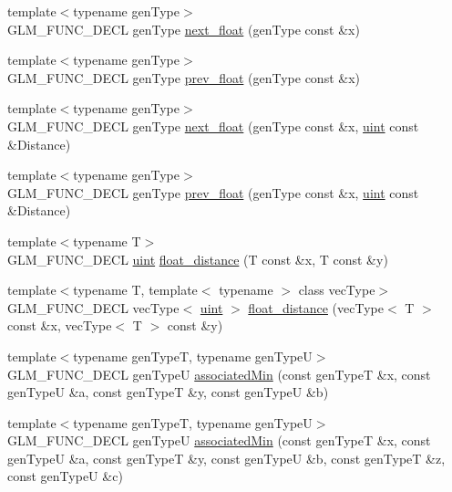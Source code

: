 \begin{CompactItemize}
\item 
{\footnotesize template$<$typename genType$>$ }\\GLM\_\-FUNC\_\-DECL genType \hyperlink{group__gtc__ulp_g5ec4457d254b7b960db32f10d219fd6f}{next\_\-float} (genType const \&x)
\item 
{\footnotesize template$<$typename genType$>$ }\\GLM\_\-FUNC\_\-DECL genType \hyperlink{group__gtc__ulp_gf1c61fb2a0092a4222dae424dd96aeb0}{prev\_\-float} (genType const \&x)
\item 
{\footnotesize template$<$typename genType$>$ }\\GLM\_\-FUNC\_\-DECL genType \hyperlink{group__gtc__ulp_g686013928fd7c76c5f100b84483b1f51}{next\_\-float} (genType const \&x, \hyperlink{group__core__precision_g4fd29415871152bfb5abd588334147c8}{uint} const \&Distance)
\item 
{\footnotesize template$<$typename genType$>$ }\\GLM\_\-FUNC\_\-DECL genType \hyperlink{group__gtc__ulp_ge55d449df292398361ccecad1cc5ead4}{prev\_\-float} (genType const \&x, \hyperlink{group__core__precision_g4fd29415871152bfb5abd588334147c8}{uint} const \&Distance)
\item 
{\footnotesize template$<$typename T$>$ }\\GLM\_\-FUNC\_\-DECL \hyperlink{group__core__precision_g4fd29415871152bfb5abd588334147c8}{uint} \hyperlink{group__gtc__ulp_g4cb4468c9654077d40266d039158206b}{float\_\-distance} (T const \&x, T const \&y)
\item 
{\footnotesize template$<$typename T, template$<$ typename $>$ class vecType$>$ }\\GLM\_\-FUNC\_\-DECL vecType$<$ \hyperlink{group__core__precision_g4fd29415871152bfb5abd588334147c8}{uint} $>$ \hyperlink{group__gtc__ulp_g421b0584182815a9e9e64d74361e7409}{float\_\-distance} (vecType$<$ T $>$ const \&x, vecType$<$ T $>$ const \&y)
\item 
{\footnotesize template$<$typename genTypeT, typename genTypeU$>$ }\\GLM\_\-FUNC\_\-DECL genTypeU \hyperlink{group__gtx__associated__min__max_ge85252492710f54ac1ba963a3468a6d6}{associatedMin} (const genTypeT \&x, const genTypeU \&a, const genTypeT \&y, const genTypeU \&b)
\item 
{\footnotesize template$<$typename genTypeT, typename genTypeU$>$ }\\GLM\_\-FUNC\_\-DECL genTypeU \hyperlink{group__gtx__associated__min__max_g2d68336e5522b3f78f824ae2f0aea8db}{associatedMin} (const genTypeT \&x, const genTypeU \&a, const genTypeT \&y, const genTypeU \&b, const genTypeT \&z, const genTypeU \&c)

\end{CompactItemize}
